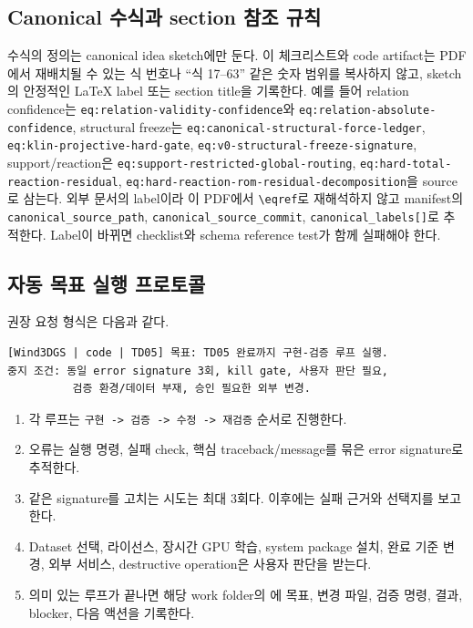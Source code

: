 \documentclass[10pt,a4paper]{article}
\newcommand{\code}[1]{\texttt{#1}}
\begin{document}
\subsection{Canonical 수식과 section 참조 규칙}

수식의 정의는 canonical idea sketch에만 둔다. 이 체크리스트와 code artifact는
PDF에서 재배치될 수 있는 식 번호나 ``식 17--63'' 같은 숫자 범위를 복사하지 않고,
sketch의 안정적인 LaTeX label 또는 section title을 기록한다.
예를 들어 relation confidence는 \code{eq:relation-validity-confidence}와
\code{eq:relation-absolute-confidence}, structural freeze는
\code{eq:canonical-structural-force-ledger},
\code{eq:klin-projective-hard-gate},
\code{eq:v0-structural-freeze-signature}, support/reaction은
\code{eq:support-restricted-global-routing},
\code{eq:hard-total-reaction-residual},
\code{eq:hard-reaction-rom-residual-decomposition}을 source로 삼는다.
외부 문서의 label이라 이 PDF에서 \code{\textbackslash eqref}로 재해석하지 않고
manifest의 \code{canonical\_source\_path}, \code{canonical\_source\_commit},
\code{canonical\_labels[]}로 추적한다. Label이 바뀌면 checklist와 schema reference test가 함께 실패해야 한다.

\subsection{자동 목표 실행 프로토콜}

권장 요청 형식은 다음과 같다.

\begin{lstlisting}
[Wind3DGS | code | TD05] 목표: TD05 완료까지 구현-검증 루프 실행.
중지 조건: 동일 error signature 3회, kill gate, 사용자 판단 필요,
          검증 환경/데이터 부재, 승인 필요한 외부 변경.
\end{lstlisting}

\begin{enumerate}
  \item 각 루프는 \code{구현 -> 검증 -> 수정 -> 재검증} 순서로 진행한다.
  \item 오류는 실행 명령, 실패 check, 핵심 traceback/message를 묶은 error signature로 추적한다.
  \item 같은 signature를 고치는 시도는 최대 3회다. 이후에는 실패 근거와 선택지를 보고한다.
  \item Dataset 선택, 라이선스, 장시간 GPU 학습, system package 설치, 완료 기준 변경,
  외부 서비스, destructive operation은 사용자 판단을 받는다.
  \item 의미 있는 루프가 끝나면 해당 work folder의 에
  목표, 변경 파일, 검증 명령, 결과, blocker, 다음 액션을 기록한다.
\end{enumerate}
\end{document}

